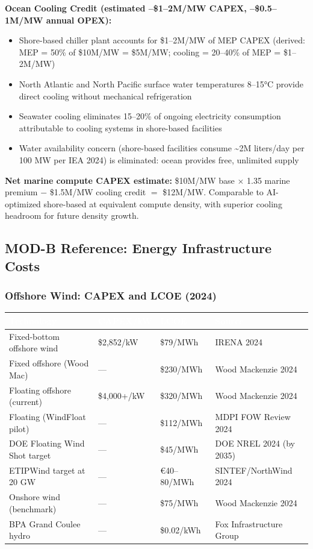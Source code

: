\documentclass[11pt,letterpaper]{article}
\newcommand{\tableheader}[1]{\textbf{\sffamily\textcolor{white}{#1}}}
\begin{document}
\textbf{Ocean Cooling Credit (estimated --\$1--2M/MW CAPEX, --\$0.5--1M/MW annual OPEX):}
\begin{itemize}[itemsep=2pt]
  \item Shore-based chiller plant accounts for \$1--2M/MW of MEP CAPEX (derived: MEP = 50\% of
    \$10M/MW = \$5M/MW; cooling = 20--40\% of MEP = \$1--2M/MW)
  \item North Atlantic and North Pacific surface water temperatures 8--15°C provide
    direct cooling without mechanical refrigeration
  \item Seawater cooling eliminates 15--20\% of ongoing electricity consumption
    attributable to cooling systems in shore-based facilities
  \item Water availability concern (shore-based facilities consume \textasciitilde{}2M liters/day per
    100 MW per IEA 2024) is eliminated: ocean provides free, unlimited supply
\end{itemize}

\textbf{Net marine compute CAPEX estimate:} \$10M/MW base $\times$ 1.35 marine premium $-$ \$1.5M/MW
cooling credit $=$ \$12M/MW. Comparable to AI-optimized shore-based at equivalent compute
density, with superior cooling headroom for future density growth.

\subsection{MOD-B Reference: Energy Infrastructure Costs}

\subsubsection{Offshore Wind: CAPEX and LCOE (2024)}

\begin{center}
\begin{tabularx}{\textwidth}{L{4cm}C{2.5cm}C{2.5cm}X}
\toprule
{}
\tableheader{Technology} & \tableheader{CAPEX/kW} & \tableheader{LCOE} & \tableheader{Source} \\
\midrule
Fixed-bottom offshore wind & \$2,852/kW & \$79/MWh & IRENA 2024 \\
Fixed offshore (Wood Mac) & --- & \$230/MWh & Wood Mackenzie 2024 \\
Floating offshore (current) & \$4,000+/kW & \$320/MWh & Wood Mackenzie 2024 \\
Floating (WindFloat pilot) & --- & \$112/MWh & MDPI FOW Review 2024 \\
DOE Floating Wind Shot target & --- & \$45/MWh & DOE NREL 2024 (by 2035) \\
ETIPWind target at 20 GW & --- & €40--80/MWh & SINTEF/NorthWind 2024 \\
Onshore wind (benchmark) & --- & \$75/MWh & Wood Mackenzie 2024 \\
BPA Grand Coulee hydro & --- & \$0.02/kWh & Fox Infrastructure Group \\
\bottomrule
\end{tabularx}
\end{center}
\end{document}
